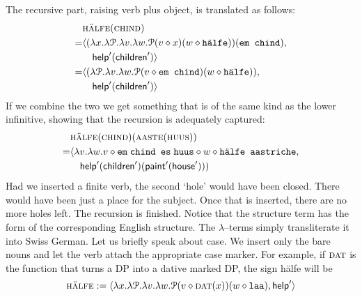 The recursive part, raising verb plus object, is translated as follows:
\begin{equation}
\begin{split}
& \mbox{\sc h\"alfe}(\mbox{\sc chind}) \\
= & \auf (\lambda x.\lambda \CP.\lambda v.\lambda w.\CP(v \oconc x)%
(w \oconc \mbox{\tt h\"alfe}))(\mbox{\tt em chind}), \\
  & \quad
	\mbox{\sf help}'(\mbox{\sf children}')\zu \\
= & \auf (\lambda \CP.\lambda v.\lambda w.\CP(v \oconc \mbox{\tt em chind})%
(w \oconc \mbox{\tt h\"alfe})), \\
  & \quad 
	\mbox{\sf help}'(\mbox{\sf children}')\zu 
\end{split}
\end{equation}
If we combine the two we get something that is of the same kind 
as the lower infinitive, showing that the recursion is adequately 
captured:
\begin{equation}
\begin{split}
& \mbox{\sc h\"alfe}(\mbox{\sc chind})(\mbox{\sc aaste}(\mbox{\sc huus}))
\\
= &  \auf \lambda v.\lambda w. v \oconc \mbox{\tt em$\;$chind es$\;$huus}%
\oconc w \oconc \mbox{\tt h\"alfe aastriche}, \\
& \quad 
\mbox{\sf help}'(\mbox{\sf children}')(\mbox{\sf paint}'(\mbox{\sf house}')))
\end{split}
\end{equation}
Had we inserted a finite verb, the second `hole' would have been 
closed. There would have been just a place for the subject. Once 
that is inserted, there are no more holes left. The recursion is 
finished. Notice that the structure term has the form of the 
corresponding English structure. The $\lambda$--terms simply 
transliterate it into Swiss German. Let us briefly speak about 
case. We insert only the bare nouns and let the verb attach the 
appropriate case marker. For example, if $\mbox{\sc dat}$ is the 
function that turns a DP into a dative marked DP, the sign 
{\sc h\"alfe} will be 
\begin{equation}
\mbox{\sc h\"alfe} := \langle\lambda x. \lambda \mathcal{P}. \lambda v.\lambda w.
    \mathcal{P}(v \diamond \mbox{\sc dat}(x))(w \diamond \mbox{\tt laa}), 
	\mbox{\sf help}'\rangle
\end{equation}

